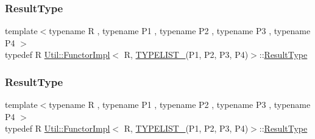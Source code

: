 \subsubsection{\texorpdfstring{ResultType}{ResultType}\hspace{0.1cm}{\footnotesize\ttfamily [1/3]}}
{\footnotesize\ttfamily template$<$typename R , typename P1 , typename P2 , typename P3 , typename P4 $>$ \\
typedef R \mbox{\hyperlink{classUtil_1_1FunctorImpl}{Util\+::\+Functor\+Impl}}$<$ R, \mbox{\hyperlink{adat__devel__install_2include_2adat_2typelist_8h_a7a156c571ab21a16b0495e1c882a07fa}{T\+Y\+P\+E\+L\+I\+S\+T\+\_}}(P1, P2, P3, P4)$>$\+::\mbox{\hyperlink{structUtil_1_1Private_1_1FunctorImplBase_a5e95fd30fdd89f3c5080b68ab5891bc3}{Result\+Type}}}

\mbox{\label{classUtil_1_1FunctorImpl_3_01R_00_01TYPELIST__4_07P1_00_01P2_00_01P3_00_01P4_08_4_a9218a4b4370d688d3e144a75e5d24cfe}} 
\subsubsection{\texorpdfstring{ResultType}{ResultType}\hspace{0.1cm}{\footnotesize\ttfamily [2/3]}}
{\footnotesize\ttfamily template$<$typename R , typename P1 , typename P2 , typename P3 , typename P4 $>$ \\
typedef R \mbox{\hyperlink{classUtil_1_1FunctorImpl}{Util\+::\+Functor\+Impl}}$<$ R, \mbox{\hyperlink{adat__devel__install_2include_2adat_2typelist_8h_a7a156c571ab21a16b0495e1c882a07fa}{T\+Y\+P\+E\+L\+I\+S\+T\+\_}}(P1, P2, P3, P4)$>$\+::\mbox{\hyperlink{structUtil_1_1Private_1_1FunctorImplBase_a5e95fd30fdd89f3c5080b68ab5891bc3}{Result\+Type}}}

\mbox{\label{classUtil_1_1FunctorImpl_3_01R_00_01TYPELIST__4_07P1_00_01P2_00_01P3_00_01P4_08_4_a9218a4b4370d688d3e144a75e5d24cfe}} 
